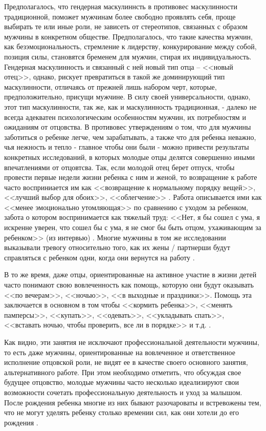 \documentclass{../../common/thesisbyxetex}
\begin{document}
Предполагалось, что гендерная маскулиннсть
в противовес маскулинности традиционной, поможет мужчинам более свободно проявлять себя, проще
выбирать те или иные роли, не зависеть от стереотипов, связанных с образом мужчины в конкретном
обществе. Предполагалось, что такие качества мужчин, как безэмоциональность, стремление к
лидерству, конкурирование между собой, позиция силы, становятся бременем для мужчин,
стирая их индивидуальность. Гендерная маскулинность и связанный с ней новый тип отца -- <<новый
отец>>, однако, рискует превратиться в такой же доминирующий тип маскулинности, отличаясь от
прежней лишь набором черт, которые,  предположительно, присущи мужчине. В силу своей
универсальности, однако, этот тип маскулинности, так же, как и маскулинность традиционная, -
далеко не всегда адекватен психологическим особенностям мужчин, их  потребностям и ожиданиям
от отцовства.  В противовес утверждениям о том, что для мужчины заботиться о ребенке легче,
чем зарабатывать, а также что для ребенка неважно, чья нежность и тепло - главное чтобы они были -
можно привести результаты конкретных исследований, в которых молодые отцы делятся совершенно иными
впечатлениями от отцовтсва. Так, если молодой отец берет отпуск, чтобы провести первые
недели жизни ребенка с ним и женой, то возвращение к работе часто восприниается им как
<<возвращение к нормальному порядку вещей>>, <<лучший выбор для обоих>>, <<облегчение>>
\cite[370]{tri}. Работа описывается ими как <<менее эмоционально утомляющая>> по сравнению с
уходом за ребенком, забота о котором воспринимается как тяжелый труд: <<Нет, я бы сошел с ума, я
искренне уверен, что сошел бы с ума, я не смог бы быть отцом, ухаживающим за ребенком>> (из
интервью) \cite[370-371]{tri}. Многие мужчины в том же исследовании выказывали тревогу относительно
того, как их жены / партнерши будут справляться с ребенком одни, когда они вернутся на работу
\cite[370-371]{tri}.

В то же время, даже отцы, ориентированные на активное участие в жизни детей часто понимают свою
вовлеченность как помощь, которую они будут оказывать
<<по вечерам>>, <<ночью>>, <<в выходные и праздники>>. Помощь эта заключается в основном в том
чтобы <<кормить ребенка>>, <<менять памперсы>>, <<купать>>, <<одевать>>, <<укладывать спать>>,
<<вставать ночью, чтобы проверить, все ли в порядке>> и т.д. \cite[369]{tri}.

Как видно, эти занятия не исключают профессиональной деятельности мужчины, то есть даже мужчины,
ориентированные на вовлеченное и ответственное исполнение отцовской роли, не видят ее в качестве
своего основного занятия, альтернативного работе. При этом необходимо отметить, что обсуждая свое
будущее отцовство, молодые мужчины часто несколько идеализируют свои возможности сочетать
профессиональную деятельность и уход за малышом. После рождения ребенка многие из них бывают
разочароваты и встревожены тем, что не могут уделять ребенку столько времении сил, как они хотели
до его рождения \cite{tri}.
\end{document}
